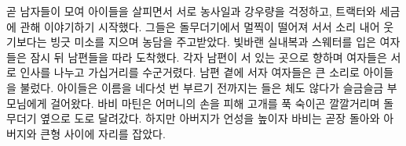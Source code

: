 \documentclass{translation}
\begin{document}
곧 남자들이 모여 아이들을 살피면서 서로 농사일과 강우량을 걱정하고, 트랙터와 세금에 관해 이야기하기 시작했다.
그들은 돌무더기에서 멀찍이 떨어져 서서 소리 내어 웃기보다는 빙긋 미소를 지으며 농담을 주고받았다.
빛바랜 실내복과 스웨터를 입은 여자들은 잠시 뒤 남편들을 따라 도착했다.
각자 남편이 서 있는 곳으로 향하며 여자들은 서로 인사를 나누고 가십거리를 수군거렸다.
남편 곁에 서자 여자들은 큰 소리로 아이들을 불렀다.
아이들은 이름을 네다섯 번 부르기 전까지는 들은 체도 않다가 슬금슬금 부모님에게 걸어왔다.
바비 마틴은 어머니의 손을 피해 고개를 푹 숙이곤 깔깔거리며 돌무더기 옆으로 도로 달려갔다.
하지만 아버지가 언성을 높이자 바비는 곧장 돌아와 아버지와 큰형 사이에 자리를 잡았다.
% 
\end{document}
